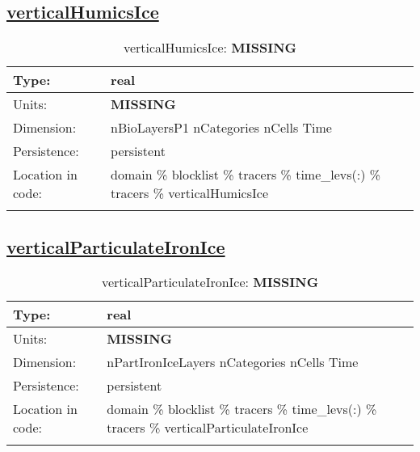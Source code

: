 \subsection[verticalHumicsIce]{\hyperref[sec:var_tab_tracers]{verticalHumicsIce}}
\label{subsec:var_sec_tracers_verticalHumicsIce}
\begin{center}
\begin{longtable}{| p{2.0in} | p{4.0in} |}
        \hline 
        Type: & real \\
        \hline 
        Units: & {\bf \color{red} MISSING} \\
        \hline 
        Dimension: & nBioLayersP1 nCategories nCells Time \\
        \hline 
        Persistence: & persistent \\
        \hline 
         Location in code: & domain \% blocklist \% tracers \% time\_levs(:) \% tracers \% verticalHumicsIce \\
         \hline 
    \caption{verticalHumicsIce: {\bf \color{red} MISSING}}
\end{longtable}
\end{center}
\subsection[verticalParticulateIronIce]{\hyperref[sec:var_tab_tracers]{verticalParticulateIronIce}}
\label{subsec:var_sec_tracers_verticalParticulateIronIce}
\begin{center}
\begin{longtable}{| p{2.0in} | p{4.0in} |}
        \hline 
        Type: & real \\
        \hline 
        Units: & {\bf \color{red} MISSING} \\
        \hline 
        Dimension: & nPartIronIceLayers nCategories nCells Time \\
        \hline 
        Persistence: & persistent \\
        \hline 
         Location in code: & domain \% blocklist \% tracers \% time\_levs(:) \% tracers \% verticalParticulateIronIce \\
         \hline 
    \caption{verticalParticulateIronIce: {\bf \color{red} MISSING}}
\end{longtable}
\end{center}
